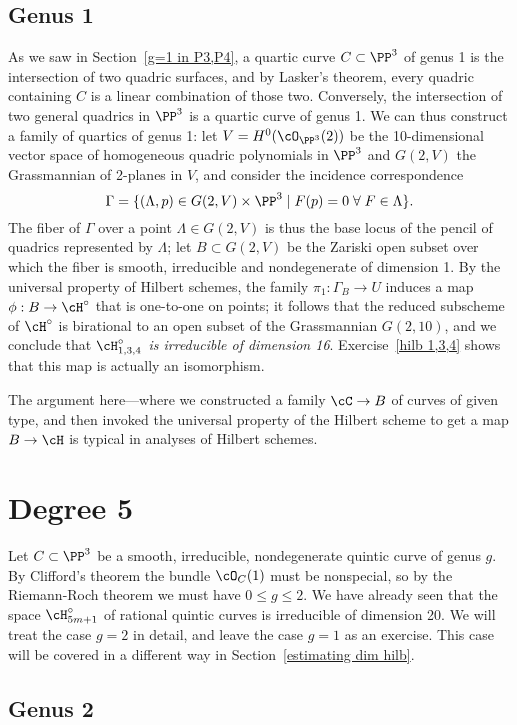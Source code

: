 \subsection{Genus 1}
 As we saw in Section~\ref{g=1 in P3,P4}, a quartic curve $C \subset \PP^3$ of genus 1 is the intersection of two quadric surfaces, and by Lasker's theorem, every quadric containing $C$ is a linear combination of those two. Conversely, the intersection of two general quadrics in $\PP^3$ is a quartic curve of genus 1. We can thus construct a family of quartics of genus 1: let $V = H^0(\cO_{\PP^3}(2))$ be the 10-dimensional vector space of homogeneous quadric polynomials in $\PP^3$ and $G(2,V)$ the Grassmannian of 2-planes in $V$, and consider the incidence correspondence
$$
\Gamma = \{ (\Lambda, p) \in G(2,V) \times \PP^3 \mid F(p)=0 \; \forall \; F \in \Lambda \}.
$$
The fiber of $\Gamma$ over a point $\Lambda \in G(2,V)$ is thus the base locus of the pencil of quadrics represented by $\Lambda$; let $B \subset G(2,V)$ be the Zariski open subset over which the fiber is smooth, irreducible and nondegenerate of dimension 1. By the universal property of Hilbert schemes, the family $\pi_1 : \Gamma_B \to U$ induces a map $\phi : B \to \cH^\circ$ that is one-to-one on points; it follows that the reduced subscheme of $\cH^\circ$ is birational to an open subset of the Grassmannian $G(2,10)$, and we conclude that \emph{$\cH^\circ_{1,3,4}$ is irreducible of dimension 16}. Exercise~\ref{hilb 1,3,4} shows that this map is actually an isomorphism.

The  argument  here---where we constructed a family $\cC \to B$ of curves of given type, and then invoked the universal property of the Hilbert scheme to get a map $B \to \cH$ is typical in analyses of Hilbert schemes. 

\section{Degree 5}

Let $C \subset \PP^3$ be a smooth, irreducible, nondegenerate quintic curve of genus $g$. By Clifford's theorem the bundle $\cO_C(1)$ must be nonspecial, so  by the Riemann-Roch theorem we must have $0\leq g \leq 2$. We have already seen that the space $\cH^\circ_{5m+1}$ of rational quintic curves is irreducible of dimension 20. We will treat the case $g=2$ in detail, and leave the case $g=1$ as an exercise. This case will be covered in a different way in Section~\ref{estimating dim hilb}.

\subsection{Genus 2}


